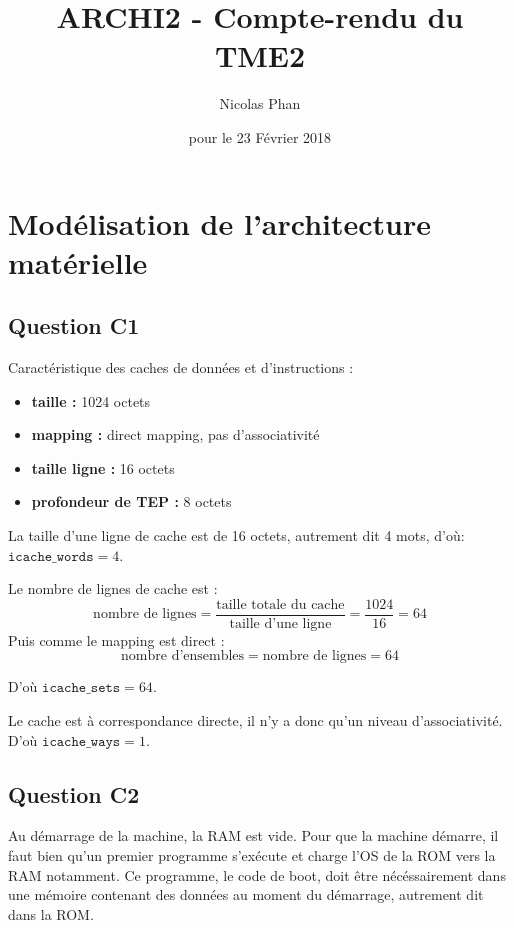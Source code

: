 \documentclass{article}
\title{ARCHI2 - Compte-rendu du TME2}
\author{Nicolas Phan}
\date{pour le 23 Février 2018}
\begin{document}
\pagestyle{headings}
\maketitle
\tableofcontents
\newpage



\section{Modélisation de l'architecture matérielle}

\subsection{Question C1}

Caractéristique des caches de données et d'instructions :
\begin{itemize}
 \item \textbf{taille :} 1024 octets
 \item \textbf{mapping :} direct mapping, pas d'associativité
 \item \textbf{taille ligne :} 16 octets
 \item \textbf{profondeur de TEP :} 8 octets
\end{itemize}

La taille d'une ligne de cache est de 16 octets, autrement dit 4 mots, d'où:
$\texttt{icache\_words} = 4$.

Le nombre de lignes de cache est :
\[ \text{nombre de lignes} =
   \frac{\text{taille totale du cache}}
	{\text{taille d'une ligne}}
    = \frac{1024}{16} = 64
\]
Puis comme le mapping est direct :
\[ \text{nombre d'ensembles} = \text{nombre de lignes} = 64 \]

D'où $\texttt{icache\_sets} = 64$.

Le cache est à correspondance directe, il n'y a donc qu'un niveau
d'associativité.
D'où $\texttt{icache\_ways} = 1$.

\subsection{Question C2}

Au démarrage de la machine, la RAM est vide. Pour que la machine démarre,
il faut bien qu'un premier programme s'exécute et charge l'OS de la ROM vers
la RAM notamment.
Ce programme, le code de boot, doit être nécéssairement dans une mémoire
contenant des données au moment du démarrage, autrement dit dans la ROM.
\end{document}
